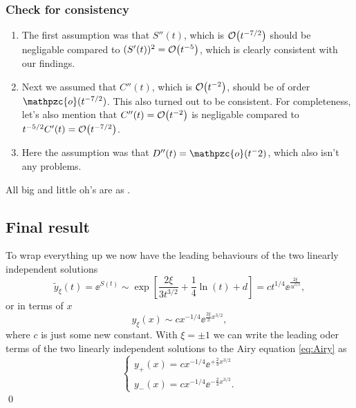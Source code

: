 \documentclass[11pt,letter, swedish, english
]{article}
\newcommand{\oh}{\ensuremath\mathpzc{o}}
\begin{document}
\subsubsection{Check for consistency}
\begin{enumerate}[label=(\roman*)]
\item 
The first assumption was that $S''(t)$, which is $\order{t^{-7/2}}$
should be negligable compared to $(S'(t))^2=\order{t^{-5}}$, which is
clearly consistent with our findings.
\item 
Next we assumed that $C''(t)$, which is $\order{t^{-2}}$, should be
of order $\oh(t^{-7/2})$. This also turned out to be consistent. For
completeness, let's also mention that $C''(t)=\order{t^{-2}}$ is
negligable compared to $t^{-5/2}C'(t)=\order{t^{-7/2}}$.
\item 
Here the assumption was that $D''(t)=\oh(t^-2)$, which also isn't any
problems. 
\end{enumerate}
All big and little oh's are as \ttoz.

\subsection*{Final result}
To wrap everything up we now have the leading behaviours of the two
linearly independent solutions
\begin{equation}
\tilde{y}_\xi(t)=\ee^{S(t)}
\sim\exp[\frac{2\xi}{3t^{3/2}}+\frac{1}{4}\ln(t)+d]
=c t^{1/4} \ee^{\frac{2\xi}{3t^{3/2}}},
\end{equation}
or in terms of $x$
\begin{equation}
y_\xi(x)\sim c x^{-1/4} \ee^{\frac{2\xi}{3}x^{3/2}},
\end{equation}
where $c$ is just some new constant. With $\xi=\pm1$ we can write the
leading oder terms of the two linearly independent solutions to the
Airy equation \eqref{eq:Airy} as
\begin{equation}
\begin{cases}
y_+(x)= c x^{-1/4} \ee^{+\frac{2}{3}x^{3/2}}\\
y_-(x)= c x^{-1/4} \ee^{-\frac{2}{3}x^{3/2}}.
\end{cases}
\end{equation}
\qed
\end{document}
